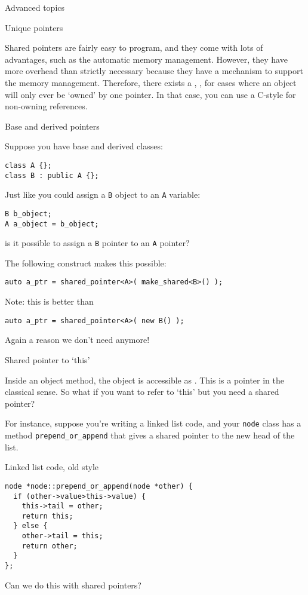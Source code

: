  {Advanced topics}

 {Unique pointers}

Shared pointers are fairly easy to program, and they come with lots of
advantages, such as the automatic memory management. However, they
have more overhead than strictly necessary because they have a
 mechanism to support the memory
management. Therefore, there exists a ,
, for cases where an object will only ever be
`owned' by one pointer. In that case, you can use a C-style
 for non-owning references.

 {Base and derived pointers}

Suppose you have base and derived classes:
\begin{lstlisting}
class A {};
class B : public A {};  
\end{lstlisting}
Just like you could assign a \lstinline{B} object to an \lstinline{A}
variable:
\begin{lstlisting}
B b_object;
A a_object = b_object;
\end{lstlisting}
is it possible to assign a \lstinline{B} pointer to an \lstinline{A}
pointer?

The following construct makes this possible:
\begin{lstlisting}
auto a_ptr = shared_pointer<A>( make_shared<B>() );
\end{lstlisting}

Note: this is better than
\begin{lstlisting}
auto a_ptr = shared_pointer<A>( new B() );
\end{lstlisting}
Again a reason we don't need  anymore!

 {Shared pointer to `this'}

Inside an object method, the object is accessible as
. This is a pointer in the classical sense. So what
if you want to refer to `this' but you need a shared pointer?

For instance, suppose you're writing a linked list code, and your
\lstinline{node} class has a method \lstinline{prepend_or_append} that gives a shared
pointer to the new head of the list.

\begin{slide}{Linked list code, old style}
  \label{sl:share-ptr-node}  
\begin{lstlisting}
node *node::prepend_or_append(node *other) {
  if (other->value>this->value) {
    this->tail = other;
    return this;
  } else {
    other->tail = this;
    return other;
  }
};
\end{lstlisting}
Can we do this with shared pointers?
\end{slide}

